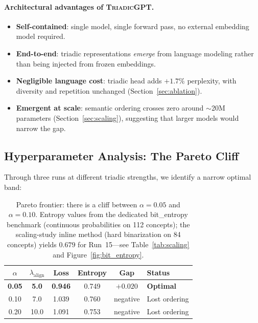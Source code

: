 \documentclass[11pt,a4paper]{article}
\newcommand{\microgpt}{\textsc{TriadicGPT}}
\begin{document}
\paragraph{Architectural advantages of \microgpt{}.}
\begin{itemize}
    \item \textbf{Self-contained}: single model, single forward pass, no external embedding model required.
    \item \textbf{End-to-end}: triadic representations \emph{emerge} from language modeling rather than being injected from frozen embeddings.
    \item \textbf{Negligible language cost}: triadic head adds $+1.7\%$ perplexity, with diversity and repetition unchanged (Section~\ref{sec:ablation}).
    \item \textbf{Emergent at scale}: semantic ordering crosses zero around $\sim$20M parameters (Section~\ref{sec:scaling}), suggesting that larger models would narrow the gap.
\end{itemize}


\subsection{Hyperparameter Analysis: The Pareto Cliff}
\label{sec:pareto}

Through three runs at different triadic strengths, we identify a narrow optimal band:

\begin{table}[h]
\centering
\caption{Pareto frontier: there is a cliff between $\alpha = 0.05$ and $\alpha = 0.10$. Entropy values from the dedicated bit\_entropy benchmark (continuous probabilities on 112 concepts); the scaling-study inline method (hard binarization on 84 concepts) yields $0.679$ for Run~15---see Table~\ref{tab:scaling} and Figure~\ref{fig:bit_entropy}.}
\label{tab:pareto}
\begin{tabular}{cccccl}
\toprule
$\alpha$ & $\lambda_{\text{align}}$ & Loss & Entropy & Gap & Status \\
\midrule
\textbf{0.05} & \textbf{5.0} & \textbf{0.946} & 0.749 & $\mathbf{+0.020}$ & \textbf{Optimal} \\
0.10 & 7.0 & 1.039 & 0.760 & negative & Lost ordering \\
0.20 & 10.0 & 1.091 & 0.753 & negative & Lost ordering \\
\bottomrule
\end{tabular}
\end{table}
\end{document}
